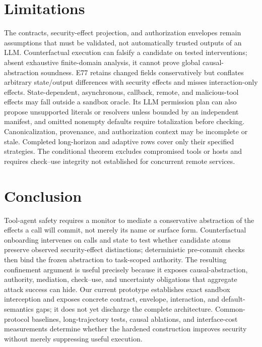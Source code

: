 \documentclass[letterpaper,twocolumn,10pt]{article}
\begin{document}
 \section{Limitations}

The contracts, security-effect projection, and authorization envelopes remain assumptions that must be validated, not automatically trusted outputs of an LLM. Counterfactual execution can falsify a candidate on tested interventions; absent exhaustive finite-domain analysis, it cannot prove global causal-abstraction soundness. E77 retains changed fields conservatively but conflates arbitrary state/output differences with security effects and misses interaction-only effects. State-dependent, asynchronous, callback, remote, and malicious-tool effects may fall outside a sandbox oracle. Its LLM permission plan can also propose unsupported literals or resolvers unless bounded by an independent manifest, and omitted nonempty defaults require totalization before checking. Canonicalization, provenance, and authorization context may be incomplete or stale. Completed long-horizon and adaptive rows cover only their specified strategies. The conditional theorem excludes compromised tools or hosts and requires check--use integrity not established for concurrent remote services.
 \section{Conclusion}

Tool-agent safety requires a monitor to mediate a conservative abstraction of the effects a call will commit, not merely its name or surface form. Counterfactual onboarding intervenes on calls and state to test whether candidate atoms preserve observed security-effect distinctions; deterministic pre-commit checks then bind the frozen abstraction to task-scoped authority. The resulting confinement argument is useful precisely because it exposes causal-abstraction, authority, mediation, check--use, and uncertainty obligations that aggregate attack success can hide. Our current prototype establishes exact sandbox interception and exposes concrete contract, envelope, interaction, and default-semantics gaps; it does not yet discharge the complete architecture. Common-protocol baselines, long-trajectory tests, causal ablations, and interface-cost measurements determine whether the hardened construction improves security without merely suppressing useful execution.
 


\end{document}
